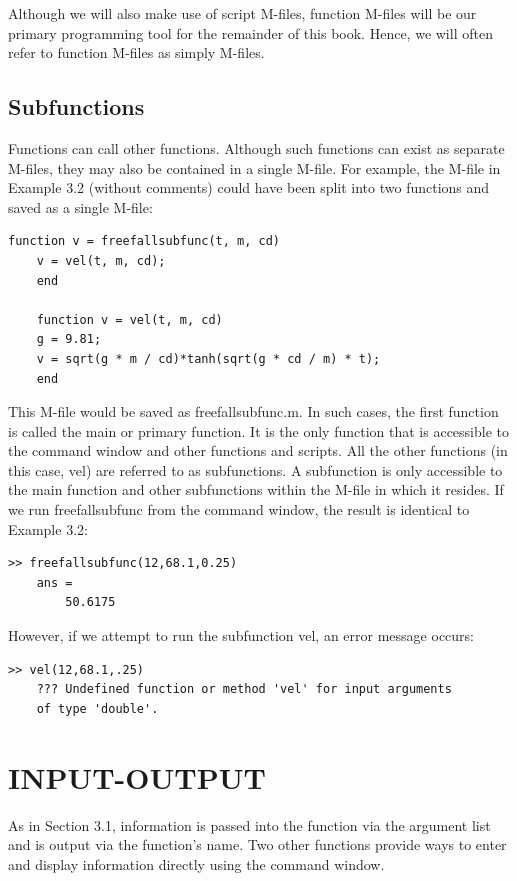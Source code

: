 \documentclass[../main.tex]{subfiles}
\begin{document}
Although we will also make use of script M-files, function M-files will be our primary
programming tool for the remainder of this book. Hence, we will often refer to function
M-files as simply M-files.

\subsection{Subfunctions}
Functions can call other functions. Although such functions can exist as separate M-files,
they may also be contained in a single M-file. For example, the M-file in Example 3.2
(without comments) could have been split into two functions and saved as a single
M-file:
\begin{lstlisting}[frame=none, numbers=none]
    function v = freefallsubfunc(t, m, cd)
    v = vel(t, m, cd);
    end

    function v = vel(t, m, cd)
    g = 9.81;
    v = sqrt(g * m / cd)*tanh(sqrt(g * cd / m) * t);
    end
\end{lstlisting}


This M-file would be saved as {freefallsubfunc.m}. In such cases, the first function is
called the main or primary function. It is the only function that is accessible to the command window 
and other functions and scripts. All the other functions (in this case, {vel}) are
referred to as {subfunctions}.
A subfunction is only accessible to the main function and other subfunctions within
the M-file in which it resides. If we run {freefallsubfunc} from the command window,
the result is identical to Example 3.2:
\begin{lstlisting}[frame=none, numbers=none]
    >> freefallsubfunc(12,68.1,0.25)
    ans =
        50.6175
\end{lstlisting}

However, if we attempt to run the subfunction vel, an error message occurs:
\begin{lstlisting}[frame=none, numbers=none]
    >> vel(12,68.1,.25)
    ??? Undefined function or method 'vel' for input arguments
    of type 'double'.
\end{lstlisting}

\section{INPUT-OUTPUT}

As in Section 3.1, information is passed into the function via the argument list and is output via the function's name. Two other functions provide ways
 to enter and display information directly using the command window.
\end{document}
